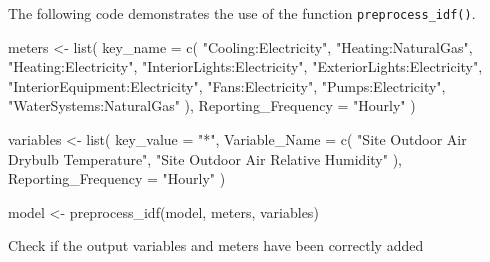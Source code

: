 \documentclass[
]{book}
\newenvironment{Shaded}{\begin{snugshade}}{\end{snugshade}}
\newcommand{\AttributeTok}[1]{\textcolor[rgb]{0.77,0.63,0.00}{#1}}
\newcommand{\CommentTok}[1]{\textcolor[rgb]{0.56,0.35,0.01}{\textit{#1}}}
\newcommand{\FunctionTok}[1]{\textcolor[rgb]{0.00,0.00,0.00}{#1}}
\newcommand{\NormalTok}[1]{#1}
\newcommand{\OtherTok}[1]{\textcolor[rgb]{0.56,0.35,0.01}{#1}}
\newcommand{\SpecialCharTok}[1]{\textcolor[rgb]{0.00,0.00,0.00}{#1}}
\newcommand{\StringTok}[1]{\textcolor[rgb]{0.31,0.60,0.02}{#1}}
\begin{document}
\begin{Shaded}
\end{Shaded}

The following code demonstrates the use of the function \texttt{preprocess\_idf()}.

\begin{Shaded}
\begin{Highlighting}[]
\NormalTok{meters }\OtherTok{\textless{}{-}} \FunctionTok{list}\NormalTok{(}
    \AttributeTok{key\_name =} \FunctionTok{c}\NormalTok{(}
        \StringTok{"Cooling:Electricity"}\NormalTok{,}
        \StringTok{"Heating:NaturalGas"}\NormalTok{,}
        \StringTok{"Heating:Electricity"}\NormalTok{,}
        \StringTok{"InteriorLights:Electricity"}\NormalTok{,}
        \StringTok{"ExteriorLights:Electricity"}\NormalTok{,}
        \StringTok{"InteriorEquipment:Electricity"}\NormalTok{,}
        \StringTok{"Fans:Electricity"}\NormalTok{,}
        \StringTok{"Pumps:Electricity"}\NormalTok{,}
        \StringTok{"WaterSystems:NaturalGas"}
\NormalTok{    ),}
    \AttributeTok{Reporting\_Frequency =} \StringTok{"Hourly"}
\NormalTok{)}

\NormalTok{variables }\OtherTok{\textless{}{-}} \FunctionTok{list}\NormalTok{(}
    \AttributeTok{key\_value =} \StringTok{"*"}\NormalTok{,}
    \AttributeTok{Variable\_Name =} \FunctionTok{c}\NormalTok{(}
        \StringTok{"Site Outdoor Air Drybulb Temperature"}\NormalTok{,}
        \StringTok{"Site Outdoor Air Relative Humidity"}
\NormalTok{    ),}
    \AttributeTok{Reporting\_Frequency =} \StringTok{"Hourly"}
\NormalTok{)}

\NormalTok{model }\OtherTok{\textless{}{-}} \FunctionTok{preprocess\_idf}\NormalTok{(model, meters, variables)}
\end{Highlighting}
\end{Shaded}

Check if the output variables and meters have been correctly added
\end{document}
